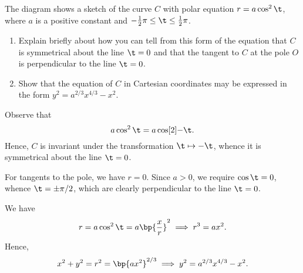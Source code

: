 \clearpage
\begin{problem}
    The diagram shows a sketch of the curve $C$ with polar equation $r = a\cos^2 \t$, where $a$ is a positive constant and $-\frac12 \pi \leq \t \leq \frac12 \pi$.

    \begin{center}
    \end{center}

    \begin{enumerate}
        \item Explain briefly about how you can tell from this form of the equation that $C$ is symmetrical about the line $\t = 0$ and that the tangent to $C$ at the pole $O$ is perpendicular to the line $\t = 0$.
        \item Show that the equation of $C$ in Cartesian coordinates may be expressed in the form $y^2 = a^{2/3} x^{4/3} - x^2$.
    \end{enumerate}
\end{problem}
\begin{solution}
    \begin{ppart}
        Observe that \[a\cos^2 \t = a\cos[2]{-\t}.\] Hence, $C$ is invariant under the transformation $\t \mapsto -\t$, whence it is symmetrical about the line $\t = 0$.

        For tangents to the pole, we have $r = 0$. Since $a > 0$, we require $\cos \t = 0$, whence $\t = \pm \pi/2$, which are clearly perpendicular to the line $\t = 0$.
    \end{ppart}
    \begin{ppart}
        We have \[r = a\cos^2 \t = a \bp{\frac{x}{r}}^2 \implies r^3 = ax^2.\] Hence, \[x^2 + y^2 = r^2 = \bp{ax^2}^{2/3} \implies y^2 = a^{2/3} x^{4/3} - x^2.\]
    \end{ppart}
\end{solution}


